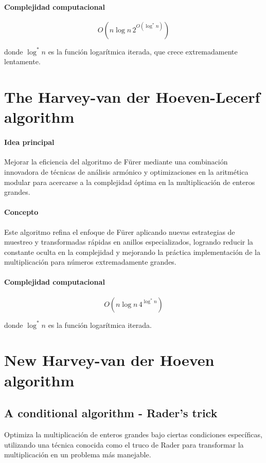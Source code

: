 \paragraph{Complejidad computacional} 
\[
    O\left(n \log n \, 2^{O(\log^{*} n)}\right)
\]

donde \( \log^{*} n \) es la función logarítmica iterada, que crece extremadamente lentamente.

\section{The Harvey-van der Hoeven-Lecerf algorithm}

\paragraph{Idea principal} 
Mejorar la eficiencia del algoritmo de F\"urer mediante una combinación innovadora de técnicas de análisis armónico y optimizaciones en la aritmética modular para acercarse a la complejidad óptima en la multiplicación de enteros grandes.

\paragraph{Concepto} 
Este algoritmo refina el enfoque de F\"urer aplicando nuevas estrategias de muestreo y transformadas rápidas en anillos especializados, logrando reducir la constante oculta en la complejidad y mejorando la práctica implementación de la multiplicación para números extremadamente grandes.

\paragraph{Complejidad computacional} 
\[
    O\left(n \log n \, 4^{\log^{*} n}\right)
\]

donde \( \log^{*} n \) es la función logarítmica iterada.

\section{New Harvey-van der Hoeven algorithm}

\subsection{A conditional algorithm - Rader's trick}

Optimiza la multiplicación de enteros grandes bajo ciertas condiciones específicas, utilizando una técnica conocida como el truco de Rader para transformar la multiplicación en un problema más manejable.

